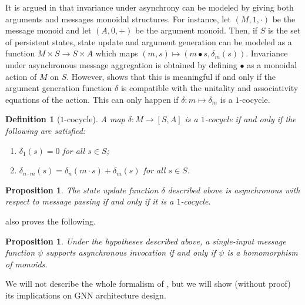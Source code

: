 \documentclass[11pt,a4paper,openright,twoside]{report}
\newcounter{mycounter}
\theoremstyle{plain}
\newtheorem{proposition}[mycounter]{Proposition}
\newtheorem{definition}[mycounter]{Definition}
\theoremstyle{definition}
\begin{document}
It is argued in \cite{dudzik2024asynchronous} that invariance under asynchrony can be modeled by giving both arguments and messages monoidal structures. For instance, let $(M, 1, \cdot)$ be the message monoid and let $(A, 0, +)$ be the argument monoid. Then, if $S$ is the set of persistent states, state update and argument generation can be modeled as a function $M \times S \to S \times A$ which maps $(m,s) \mapsto (m \bullet s, \delta_m(s))$. Invariance under asynchronous message aggregation is obtained by defining $\bullet$ as a monoidal action of $M$ on $S$. However, \cite{dudzik2024asynchronous} shows that this is meaningful if and only if the argument generation function $\delta$ is compatible with the unitality and associativity equations of the action. This can only happen if $\delta: m \mapsto \delta_m$ is a $1$-cocycle.

\begin{definition}[$1$-cocycle]
  A map $\delta: M \to [S,A]$ is a $1$-cocycle if and only if the following are satisfied:
  \begin{enumerate}
    \item $\delta_1(s) = 0$ for all $s \in S$;
    \item $\delta_{n \cdot m}(s) = \delta_{n}(m \cdot s) + \delta_m(s)$ for all $s \in S$.
  \end{enumerate} 
  \label{def: cocycle}
\end{definition}

\begin{proposition}
  The state update function $\delta$ described above is asynchronous with respect to message passing if and only if it is a $1$-cocycle.
\end{proposition}

\cite{dudzik2024asynchronous} also proves the following.

\begin{proposition}
  Under the hypotheses described above, a single-input message function $\psi$ supports asynchronous invocation if and only if $\psi$ is a homomorphism of monoids.
\end{proposition}

We will not describe the whole formalism of \cite{dudzik2024asynchronous}, but we will show (without proof) its implications on GNN architecture design. 
\end{document}
